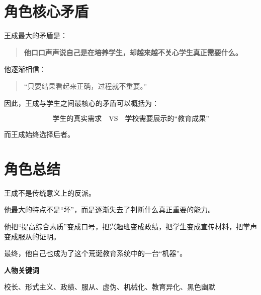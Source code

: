\documentclass[12pt,a4paper]{ctexart}
\begin{document}
\section{角色核心矛盾}

王成最大的矛盾是：

\begin{quote}
    \textbf{他口口声声说自己是在培养学生，却越来越不关心学生真正需要什么。}
\end{quote}

他逐渐相信：

\begin{quote}
    “只要结果看起来正确，过程就不重要。”
\end{quote}

因此，王成与学生之间最核心的矛盾可以概括为：

\[
    \boxed{
        \text{学生的真实需求} \quad\mathrm{VS}\quad \text{学校需要展示的“教育成果”}
    }
\]

而王成始终选择后者。

\section{角色总结}

王成不是传统意义上的反派。

他最大的特点不是“坏”，而是逐渐失去了判断什么真正重要的能力。

他把“提高综合素质”变成口号，把兴趣班变成政绩，把学生变成宣传材料，把掌声变成服从的证明。

最终，他自己也成为了这个荒诞教育系统中的一台“机器”。

\vspace{1em}

\begin{center}
    \textbf{人物关键词}

    \vspace{0.5em}

    校长、形式主义、政绩、服从、虚伪、机械化、教育异化、黑色幽默
\end{center}
\end{document}
